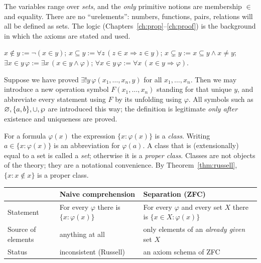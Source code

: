 The variables range over \emph{sets}, and the \emph{only} primitive notions are membership $\in$ and equality. There are no ``urelements'': numbers, functions, pairs, relations will all be defined as sets. The logic (Chapters~\ref{ch:prop}--\ref{ch:proof}) is the background in which the axioms are stated and used.

\begin{definition}[Abbreviations]
	$x\notin y:=\neg(x\in y)$; $x\subseteq y:=\forall z\,(z\in x\Rightarrow z\in y)$; $x\subsetneq y:= x\subseteq y\wedge x\neq y$; $\exists x\in y\,\varphi:=\exists x\,(x\in y\wedge\varphi)$; $\forall x\in y\,\varphi:=\forall x\,(x\in y\Rightarrow\varphi)$.
\end{definition}

\begin{definition}\label{def:defext}
	Suppose we have proved $\exists!y\,\varphi(x_1,\dots,x_n,y)$ for all $x_1,\dots,x_n$. Then we may introduce a new operation symbol $F(x_1,\dots,x_n)$ standing for that unique $y$, and abbreviate every statement using $F$ by its unfolding using $\varphi$. All symbols such as $\varnothing,\{a,b\},\cup,\wp$ are introduced this way; the definition is legitimate \emph{only after} existence and uniqueness are proved.
\end{definition}

\begin{definition}[Classes]
	For a formula $\varphi(x)$ the expression $\{x:\varphi(x)\}$ is a \emph{class}. Writing $a\in\{x:\varphi(x)\}$ is an abbreviation for $\varphi(a)$. A class that is (extensionally) equal to a set is called a \emph{set}; otherwise it is a \emph{proper class}. Classes are not objects of the theory; they are a notational convenience. By Theorem~\ref{thm:russell}, $\{x:x\notin x\}$ is a proper class.
\end{definition}

\begin{center}
	\begin{tabular}{@{}p{3.3cm}p{5.6cm}p{5.6cm}@{}}
		\toprule
		& \textbf{Naive comprehension} & \textbf{Separation (ZFC)}\\
		\midrule
		Statement & For every $\varphi$ there is $\{x:\varphi(x)\}$ & For every $\varphi$ and every set $X$ there is $\{x\in X:\varphi(x)\}$\\
		Source of elements & anything at all & only elements of an \emph{already given} set $X$\\
		Status & inconsistent (Russell) & an axiom schema of ZFC\\
		\bottomrule
	\end{tabular}
\end{center}

